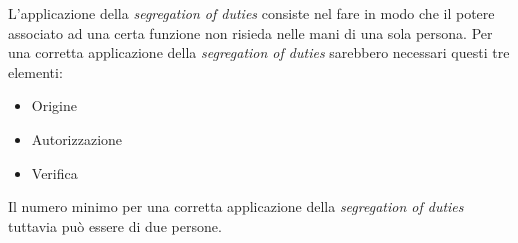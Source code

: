 \begin{Answer} [
  ref={fr7},
  number={7}
 ]
 \Question L'applicazione della \textit{segregation of duties} consiste nel 
fare in modo che il potere associato ad una certa funzione non risieda nelle 
mani di una sola persona. Per una corretta applicazione della 
\textit{segregation of duties} sarebbero necessari questi tre elementi:
\begin{itemize}
 \item Origine
 \item Autorizzazione
 \item Verifica
\end{itemize}

Il numero minimo per una corretta applicazione della \textit{segregation of 
duties} tuttavia pu\`o essere di due persone.

\end{Answer}

